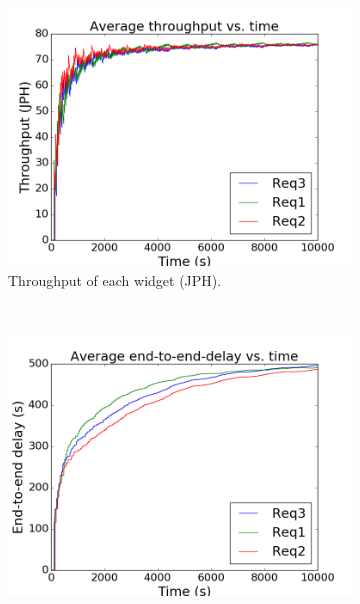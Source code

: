\begin{figure}[!t]
\centering
    \begin{subfigure}[t]{0.33\linewidth}
        \centering
\includegraphics[width=0.99\columnwidth]{Figures/b3-throughput}
\caption{Throughput of each widget (JPH).}
\label{fig:linear_plus_jph}
    \end{subfigure}%
        ~%
    \begin{subfigure}[t]{0.33\linewidth}
        \centering     
\includegraphics[width=0.99\columnwidth]{Figures/b3-end-to-end}

\end{subfigure}
\end{figure}
